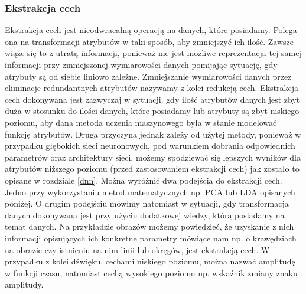 
\subsubsection{Ekstrakcja cech}
Ekstrakcja cech jest nieodwracalną operacją na danych, które posiadamy. Polega ona na transformacji atrybutów w taki sposób, aby zmniejszyć ich ilość. Zawsze wiąże się to z utratą informacji, ponieważ nie jest możliwe reprezentacja tej samej informacji przy zmniejszonej wymiarowości danych pomijając sytuację, gdy atrybuty są od siebie liniowo zależne. Zmniejszanie wymiarowości danych przez eliminacje redundantnych atrybutów nazywamy z kolei redukcją cech. 
Ekstrakcja cech dokonywana jest zazwyczaj w sytuacji, gdy ilość atrybutów danych jest zbyt duża w stosunku do ilości danych, które posiadamy lub atrybuty są zbyt niskiego poziomu, aby dana metoda uczenia maszynowego była w stanie modelować funkcję atrybutów. Druga przyczyna jednak zależy od użytej metody, ponieważ w przypadku głębokich sieci neuronowych, pod warunkiem dobrania odpowiednich parametrów oraz architektury sieci, możemy spodziewać się lepszych wyników dla atrybutów niższego poziomu (przed zastosowaniem ekstrakcji cech) jak zostało to opisane w rozdziale \ref{dnn}. Można wyróżnić dwa podejścia do ekstrakcji cech. Jedno przy wykorzystaniu metod matematycznych np. PCA lub LDA opisanych poniżej. O drugim podejściu mówimy natomiast w sytuacji, gdy transformacja danych dokonywana jest przy użyciu dodatkowej wiedzy, którą posiadamy na temat danych. Na przykładzie obrazów możemy powiedzieć, że uzyskanie z nich informacji opisujących ich konkretne parametry mówiące nam np. o krawędziach na obrazie czy istnieniu na nim linii lub okręgów, jest ekstrakcją cech. W przypadku z kolei dźwięku, cechami niskiego poziomu, można nazwać amplitudę w funkcji czasu, natomiast cechą wysokiego poziomu np. wskaźnik zmiany znaku amplitudy.
